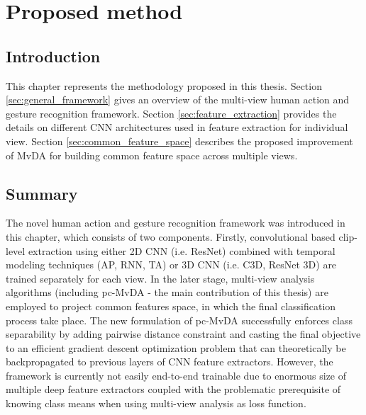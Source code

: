 
\chapter{Proposed method} \label{chap:method}
    \section{Introduction}
        This chapter represents the methodology proposed in this thesis.
        Section \ref{sec:general_framework} gives an overview of the multi-view human action and gesture recognition framework.
        Section \ref{sec:feature_extraction} provides the details on different CNN architectures used in feature extraction for individual view.
        Section \ref{sec:common_feature_space} describes the proposed improvement of MvDA for building common feature space across multiple views.

    
    
    

    \section{Summary}
        The novel human action and gesture recognition framework was introduced in this chapter, which consists of two components.
        Firstly, convolutional based clip-level extraction using either 2D CNN (i.e. ResNet) combined with temporal modeling techniques (AP, RNN, TA) or 3D CNN (i.e. C3D, ResNet 3D) are trained separately for each view.
        In the later stage, multi-view analysis algorithms (including pc-MvDA - the main contribution of this thesis) are employed to project common features space, in which the final classification process take place.
        The new formulation of pc-MvDA successfully enforces class separability by adding pairwise distance constraint and casting the final objective to an efficient gradient descent optimization problem that can theoretically be backpropagated to previous layers of CNN feature extractors.
        However, the framework is currently not easily end-to-end trainable due to enormous size of multiple deep feature extractors coupled with the problematic prerequisite of knowing class means when using multi-view analysis as loss function.

